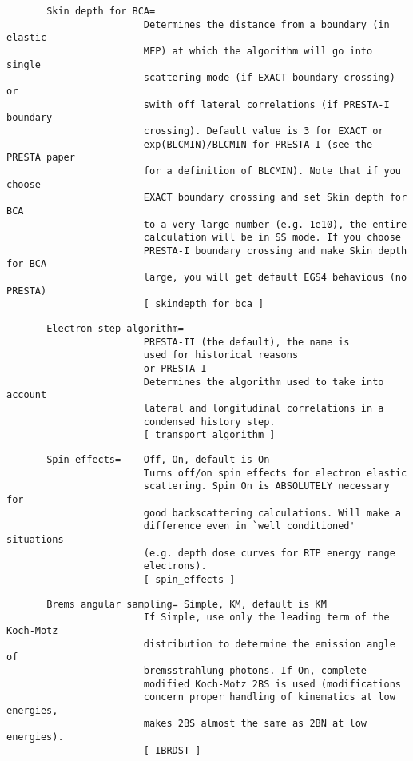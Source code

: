 \begin{verbatim}
       Skin depth for BCA=
                        Determines the distance from a boundary (in elastic
                        MFP) at which the algorithm will go into single
                        scattering mode (if EXACT boundary crossing) or
                        swith off lateral correlations (if PRESTA-I boundary
                        crossing). Default value is 3 for EXACT or
                        exp(BLCMIN)/BLCMIN for PRESTA-I (see the PRESTA paper
                        for a definition of BLCMIN). Note that if you choose
                        EXACT boundary crossing and set Skin depth for BCA
                        to a very large number (e.g. 1e10), the entire
                        calculation will be in SS mode. If you choose
                        PRESTA-I boundary crossing and make Skin depth for BCA
                        large, you will get default EGS4 behavious (no PRESTA)
                        [ skindepth_for_bca ]
\end{verbatim}
\begin{verbatim}
       Electron-step algorithm=
                        PRESTA-II (the default), the name is
                        used for historical reasons
                        or PRESTA-I
                        Determines the algorithm used to take into account
                        lateral and longitudinal correlations in a
                        condensed history step.
                        [ transport_algorithm ]
\end{verbatim}
\begin{verbatim}
       Spin effects=    Off, On, default is On
                        Turns off/on spin effects for electron elastic
                        scattering. Spin On is ABSOLUTELY necessary for
                        good backscattering calculations. Will make a
                        difference even in `well conditioned' situations
                        (e.g. depth dose curves for RTP energy range
                        electrons).
                        [ spin_effects ]
\end{verbatim}
\begin{verbatim}
       Brems angular sampling= Simple, KM, default is KM
                        If Simple, use only the leading term of the Koch-Motz
                        distribution to determine the emission angle of
                        bremsstrahlung photons. If On, complete
                        modified Koch-Motz 2BS is used (modifications
                        concern proper handling of kinematics at low energies,
                        makes 2BS almost the same as 2BN at low energies).
                        [ IBRDST ]
\end{verbatim}
